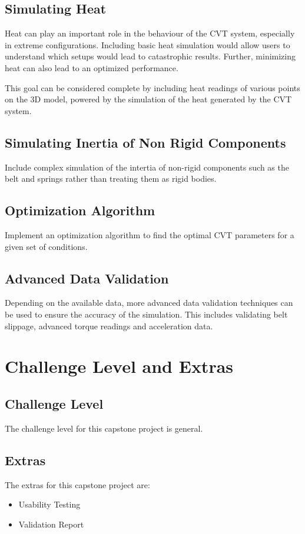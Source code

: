 \documentclass{article}
\begin{document}
\subsection{Simulating Heat}
Heat can play an important role in the behaviour of the CVT system, especially in extreme 
configurations. Including basic heat simulation would allow users to understand which
setups would lead to catastrophic results. Further, minimizing heat can also lead to an optimized
performance.

This goal can be considered complete by including heat readings of various points on the 3D 
model, powered by the simulation of the heat generated by the CVT system.

\subsection{Simulating Inertia of Non Rigid Components}
Include complex simulation of the intertia of non-rigid components such as the belt and 
springs rather than treating them as rigid bodies.

\subsection{Optimization Algorithm}
Implement an optimization algorithm to find the optimal CVT parameters for a given set of 
conditions.

\subsection{Advanced Data Validation}
Depending on the available data, more advanced data validation techniques can be used to 
ensure the accuracy of the simulation. This includes validating belt slippage, advanced torque readings and 
acceleration data.

\section{Challenge Level and Extras}

\subsection{Challenge Level}

The challenge level for this capstone project is general.

\subsection{Extras}
The extras for this capstone project are:
\begin{itemize}
    \item Usability Testing
    \item Validation Report
\end{itemize}
\end{document}
